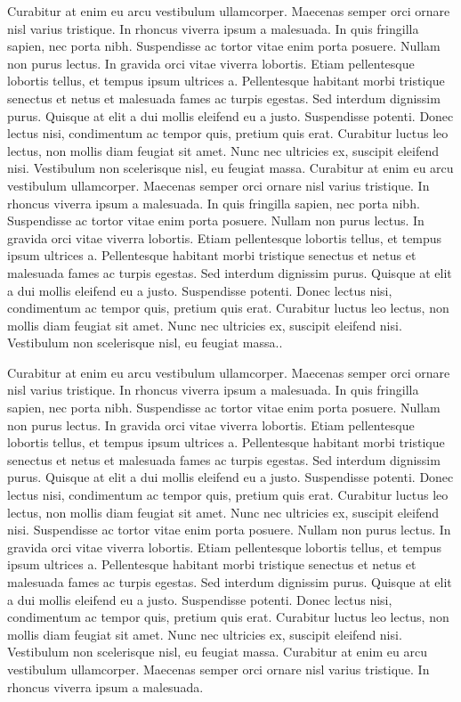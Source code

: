 \documentclass[11pt]{report}
\begin{document}
Curabitur at enim eu arcu vestibulum ullamcorper. Maecenas semper orci ornare nisl varius tristique. In rhoncus viverra ipsum a malesuada. In quis fringilla sapien, nec porta nibh. Suspendisse ac tortor vitae enim porta posuere. Nullam non purus lectus. In gravida orci vitae viverra lobortis. Etiam pellentesque lobortis tellus, et tempus ipsum ultrices a. Pellentesque habitant morbi tristique senectus et netus et malesuada fames ac turpis egestas. Sed interdum dignissim purus. Quisque at elit a dui mollis eleifend eu a justo. Suspendisse potenti. Donec lectus nisi, condimentum ac tempor quis, pretium quis erat. Curabitur luctus leo lectus, non mollis diam feugiat sit amet. Nunc nec ultricies ex, suscipit eleifend nisi. Vestibulum non scelerisque nisl, eu feugiat massa. Curabitur at enim eu arcu vestibulum ullamcorper. Maecenas semper orci ornare nisl varius tristique. In rhoncus viverra ipsum a malesuada. In quis fringilla sapien, nec porta nibh. Suspendisse ac tortor vitae enim porta posuere. Nullam non purus lectus. In gravida orci vitae viverra lobortis. Etiam pellentesque lobortis tellus, et tempus ipsum ultrices a. Pellentesque habitant morbi tristique senectus et netus et malesuada fames ac turpis egestas. Sed interdum dignissim purus. Quisque at elit a dui mollis eleifend eu a justo. Suspendisse potenti. Donec lectus nisi, condimentum ac tempor quis, pretium quis erat. Curabitur luctus leo lectus, non mollis diam feugiat sit amet. Nunc nec ultricies ex, suscipit eleifend nisi. Vestibulum non scelerisque nisl, eu feugiat massa.\cite{kayser2020current}. 

Curabitur at enim eu arcu vestibulum ullamcorper. Maecenas semper orci ornare nisl varius tristique. In rhoncus viverra ipsum a malesuada. In quis fringilla sapien, nec porta nibh. Suspendisse ac tortor vitae enim porta posuere. Nullam non purus lectus. In gravida orci vitae viverra lobortis. Etiam pellentesque lobortis tellus, et tempus ipsum ultrices a. Pellentesque habitant morbi tristique senectus et netus et malesuada fames ac turpis egestas. Sed interdum dignissim purus. Quisque at elit a dui mollis eleifend eu a justo. Suspendisse potenti. Donec lectus nisi, condimentum ac tempor quis, pretium quis erat. Curabitur luctus leo lectus, non mollis diam feugiat sit amet. Nunc nec ultricies ex, suscipit eleifend nisi.  Suspendisse ac tortor vitae enim porta posuere. Nullam non purus lectus. In gravida orci vitae viverra lobortis. Etiam pellentesque lobortis tellus, et tempus ipsum ultrices a. Pellentesque habitant morbi tristique senectus et netus et malesuada fames ac turpis egestas. Sed interdum dignissim purus. Quisque at elit a dui mollis eleifend eu a justo. Suspendisse potenti. Donec lectus nisi, condimentum ac tempor quis, pretium quis erat. Curabitur luctus leo lectus, non mollis diam feugiat sit amet. Nunc nec ultricies ex, suscipit eleifend nisi. Vestibulum non scelerisque nisl, eu feugiat massa. \cite{fitch2016world} Curabitur at enim eu arcu vestibulum ullamcorper. Maecenas semper orci ornare nisl varius tristique. In rhoncus viverra ipsum a malesuada. 
\end{document}
